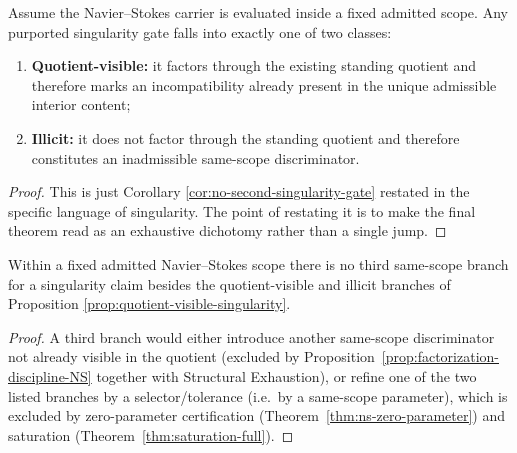 \begin{proposition}\label{prop:quotient-visible-singularity}
Assume the Navier--Stokes carrier is evaluated inside a fixed admitted scope. Any purported
singularity gate falls into exactly one of two classes:
\begin{enumerate}[label=(\roman*), leftmargin=2.2em]
\item \textbf{Quotient-visible:} it factors through the existing standing quotient and therefore marks
an incompatibility already present in the unique admissible interior content;
\item \textbf{Illicit:} it does not factor through the standing quotient and therefore constitutes an
inadmissible same-scope discriminator.
\end{enumerate}
\end{proposition}

\begin{proof}
This is just Corollary \ref{cor:no-second-singularity-gate} restated in the specific language of
singularity. The point of restating it is to make the final theorem read as an exhaustive dichotomy
rather than a single jump.
\end{proof}

\begin{corollary}\label{cor:no-third-branch}
Within a fixed admitted Navier--Stokes scope there is no third same-scope branch for a singularity
claim besides the quotient-visible and illicit branches of Proposition
\ref{prop:quotient-visible-singularity}.
\end{corollary}

\begin{proof}
A third branch would either introduce another same-scope discriminator not already visible in the quotient
(excluded by Proposition~\ref{prop:factorization-discipline-NS} together with Structural Exhaustion),
or refine one of the two listed branches by a selector/tolerance (i.e.\ by a same-scope parameter), which is excluded
by zero-parameter certification (Theorem~\ref{thm:ns-zero-parameter}) and saturation (Theorem~\ref{thm:saturation-full}).
\end{proof}

